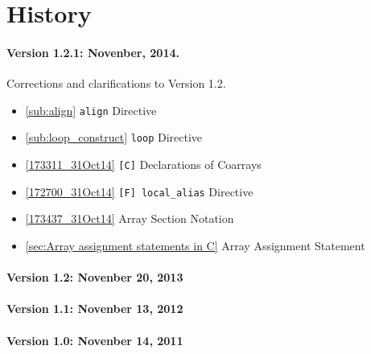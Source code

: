\section*{History}

\paragraph*{Version 1.2.1: Novenber, 2014.} Corrections and
clarifications to Version 1.2.

\begin{itemize}
  \item \ref{sub:align} {\tt align} Directive
  \item \ref{sub:loop_construct} {\tt loop} Directive
  \item \ref{173311_31Oct14} {\tt [C]} Declarations of Coarrays
  \item \ref{172700_31Oct14} {\tt [F] local\_alias} Directive
  \item \ref{173437_31Oct14} Array Section Notation
  \item \ref{sec:Array assignment statements in C} Array Assignment Statement
\end{itemize}

\paragraph*{Version 1.2: Novenber 20, 2013}

\paragraph*{Version 1.1: Novenber 13, 2012}

\paragraph*{Version 1.0: Novenber 14, 2011}